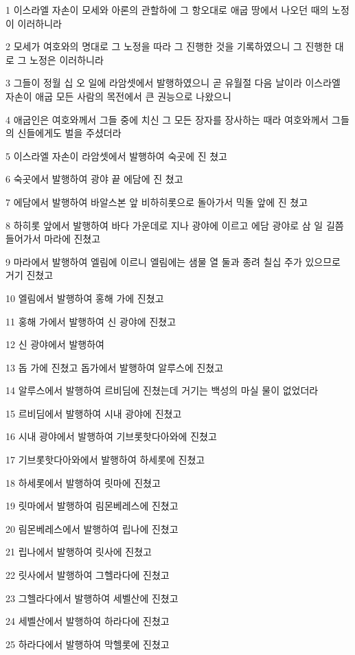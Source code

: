 \par 1 이스라엘 자손이 모세와 아론의 관할하에 그 항오대로 애굽 땅에서 나오던 때의 노정이 이러하니라
\par 2 모세가 여호와의 명대로 그 노정을 따라 그 진행한 것을 기록하였으니 그 진행한 대로 그 노정은 이러하니라
\par 3 그들이 정월 십 오 일에 라암셋에서 발행하였으니 곧 유월절 다음 날이라 이스라엘 자손이 애굽 모든 사람의 목전에서 큰 권능으로 나왔으니
\par 4 애굽인은 여호와께서 그들 중에 치신 그 모든 장자를 장사하는 때라 여호와께서 그들의 신들에게도 벌을 주셨더라
\par 5 이스라엘 자손이 라암셋에서 발행하여 숙곳에 진 쳤고
\par 6 숙곳에서 발행하여 광야 끝 에담에 진 쳤고
\par 7 에담에서 발행하여 바알스본 앞 비하히롯으로 돌아가서 믹돌 앞에 진 쳤고
\par 8 하히롯 앞에서 발행하여 바다 가운데로 지나 광야에 이르고 에담 광야로 삼 일 길쯤 들어가서 마라에 진쳤고
\par 9 마라에서 발행하여 엘림에 이르니 엘림에는 샘물 열 둘과 종려 칠십 주가 있으므로 거기 진쳤고
\par 10 엘림에서 발행하여 홍해 가에 진쳤고
\par 11 홍해 가에서 발행하여 신 광야에 진쳤고
\par 12 신 광야에서 발행하여
\par 13 돕 가에 진쳤고 돕가에서 발행하여 알루스에 진쳤고
\par 14 알루스에서 발행하여 르비딤에 진쳤는데 거기는 백성의 마실 물이 없었더라
\par 15 르비딤에서 발행하여 시내 광야에 진쳤고
\par 16 시내 광야에서 발행하여 기브롯핫다아와에 진쳤고
\par 17 기브롯핫다아와에서 발행하여 하세롯에 진쳤고
\par 18 하세롯에서 발행하여 릿마에 진쳤고
\par 19 릿마에서 발행하여 림몬베레스에 진쳤고
\par 20 림몬베레스에서 발행하여 립나에 진쳤고
\par 21 립나에서 발행하여 릿사에 진쳤고
\par 22 릿사에서 발행하여 그헬라다에 진쳤고
\par 23 그헬라다에서 발행하여 세벨산에 진쳤고
\par 24 세벨산에서 발행하여 하라다에 진쳤고
\par 25 하라다에서 발행하여 막헬롯에 진쳤고
